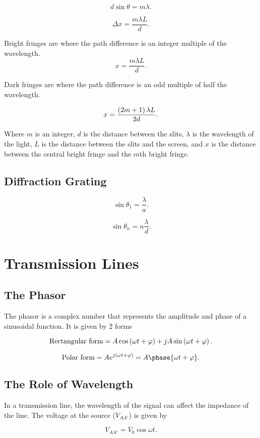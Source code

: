 \documentclass{report}
\begin{document}
\[
	d\sin \theta = m\lambda
	.\]

\[
	\Delta x = \frac{m\lambda L}{d}
	.\]

Bright fringes are where the path difference is an integer multiple of the wavelength.
\[
	x = \frac{m\lambda L}{d}
	.\]

Dark fringes are where the path difference is an odd multiple of half the wavelength.

\[
	x = \frac{\left( 2m+1 \right)\lambda L}{2d}
	.\]

Where $m$ is an integer, $d$ is the distance between the slits, $\lambda$ is the wavelength of the light, $L$ is the distance between the slits and the screen, and $x$ is the distance between the central bright fringe and the $m$th bright fringe.

\section{Diffraction Grating}

\[
	\sin \theta_1 = \frac{\lambda}{a}
	.\]

\[
	\sin \theta_n = n\frac{\lambda}{d}
	.\]

\chapter{Transmission Lines}

\section{The Phasor}

The phasor is a complex number that represents the amplitude and phase of a sinusoidal function. It is given by 2 forms

\[
	\text{Rectangular form} = A\cos \left( \omega t + \varphi \right) + jA\sin \left( \omega t + \varphi \right)
	.\]

\[
	\text{Polar form} = Ae^{j\lt( \omega t + \varphi \rt)} = A \phase{\omega t + \varphi}
	.\]

\section{The Role of Wavelength}

In a transmission line, the wavelength of the signal can affect the impedance of the line. The voltage at the source ($V_{AA'}$) is given by

\[
	V_{AA'} = V_0 \cos \omega t
	.\]
\end{document}
